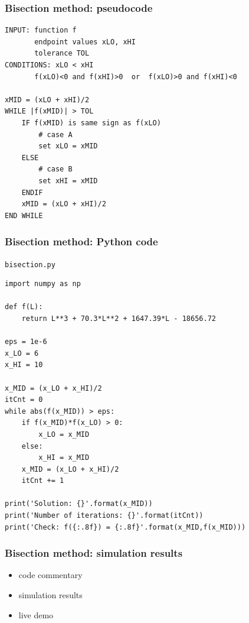 \documentclass[english,14pt]{beamer}
\begin{document}

\begin{frame}[fragile]

\frametitle{Bisection method: pseudocode}

\begin{lstlisting}[style=pseudo,basicstyle=\ttfamily\footnotesize]
INPUT: function f
       endpoint values xLO, xHI
       tolerance TOL
CONDITIONS: xLO < xHI
       f(xLO)<0 and f(xHI)>0  or  f(xLO)>0 and f(xHI)<0
       
xMID = (xLO + xHI)/2
WHILE |f(xMID)| > TOL
	IF f(xMID) is same sign as f(xLO)
		# case A
		set xLO = xMID
	ELSE
		# case B
		set xHI = xMID
	ENDIF	
	xMID = (xLO + xHI)/2
END WHILE
\end{lstlisting}

\end{frame}


\begin{frame}[fragile]

\frametitle{Bisection method: Python code}
\vspace*{-4mm}
{\small \texttt{bisection.py}}
\vspace*{-2mm}
\begin{lstlisting}[style=CStyle,basicstyle=\scriptsize]
import numpy as np

def f(L):
    return L**3 + 70.3*L**2 + 1647.39*L - 18656.72

eps = 1e-6
x_LO = 6
x_HI = 10

x_MID = (x_LO + x_HI)/2
itCnt = 0
while abs(f(x_MID)) > eps:
    if f(x_MID)*f(x_LO) > 0:
        x_LO = x_MID
    else:
        x_HI = x_MID
    x_MID = (x_LO + x_HI)/2
    itCnt += 1

print('Solution: {}'.format(x_MID))
print('Number of iterations: {}'.format(itCnt))
print('Check: f({:.8f}) = {:.8f}'.format(x_MID,f(x_MID)))
\end{lstlisting}

\end{frame}


\begin{frame}[fragile]

\frametitle{Bisection method: simulation results}

\begin{itemize}
	\item code commentary
	\item simulation results
	\item live demo
\end{itemize}

\end{frame}
\end{document}
